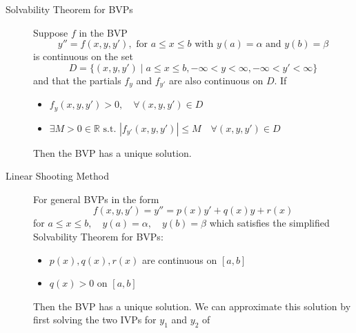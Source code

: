 \documentclass[8pt]{article}
\begin{document}

\begin{multicols}{2}
  \begin{description}
  \item[Solvability Theorem for BVPs] Suppose $f$ in the BVP
    $$y''=f(x,y,y'), \text{ for } a\leq x\leq b \text{ with } y(a)=\alpha \text{ and } y(b)=\beta$$ 
    is continuous on the set 
    $$D=\{(x,y,y') \mid a\leq x\leq b, -\infty<y<\infty, -\infty<y'<\infty\}$$
    and that the partials $f_y$ and $f_{y'}$ are also continuous on $D$. If
      \begin{itemize}
      \item $f_y(x,y,y')>0, \quad\forall (x,y,y') \in D$
      \item $\exists M>0 \in \mathbb{R} \text{ s.t. } |f_{y'}(x,y,y')|\leq M \quad\forall(x,y,y')\in D$
      \end{itemize}
      Then the BVP has a unique solution.
    \item[Linear Shooting Method] For general BVPs in the form
    $$f(x,y,y') = y'' = p(x)y' + q(x)y + r(x)$$ for $a\leq x \leq b,\quad
    y(a) = \alpha,\quad y(b) = \beta$
    which satisfies the simplified Solvability Theorem for BVPs:
    \begin{itemize}
    \item $p(x), q(x), r(x)$ are continuous on $[a,b]$
    \item $q(x)>0$ on $[a,b]$
    \end{itemize}
    Then the BVP has a unique solution. We can approximate this
    solution by first solving the two IVPs for $y_1$ and $y_2$ of 
    \begin{equation*} 

\end{equation*}
\end{description}
\end{multicols}
\end{document}
